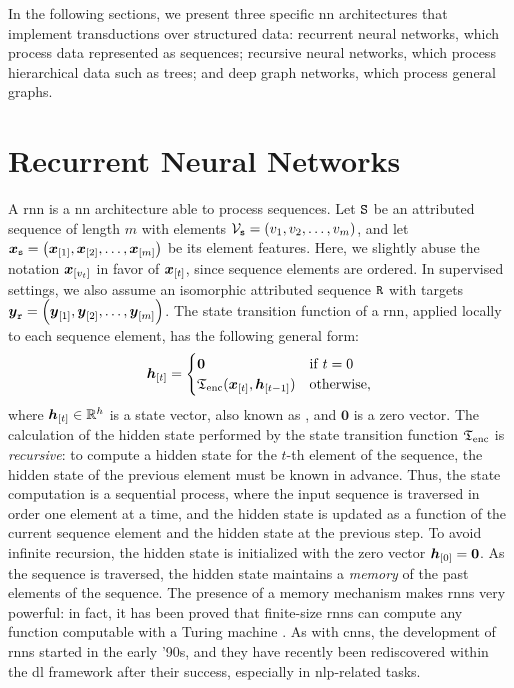 In the following sections, we present three specific \gls{nn} architectures that implement transductions over structured data: recurrent neural networks, which process data represented as sequences; recursive neural networks, which process hierarchical data such as trees; and deep graph networks, which process general graphs.

\section{Recurrent Neural Networks}\label{sec:rnns}
A \gls{rnn} is a \gls{nn} architecture able to process sequences. Let $\mathtt{S}$ be an attributed sequence of length $m$ with elements $\Nodes{s} = (v_1, v_2, \ldots, v_m)$, and let $\GraphFeatures{x}{s} = \Par{\Elem{x}{1}, \Elem{x}{2}, \ldots, \Elem{x}{m}}$ be its element features. Here, we slightly abuse the notation $\Elem{x}{v_t}$ in favor of $\Elem{x}{t}$, since sequence elements are ordered. In supervised settings, we also assume an isomorphic attributed sequence $\mathtt{R}$ with targets $\GraphFeatures{y}{r} = \Par{\Elem{y}{1}, \Elem{y}{2}, \ldots, \Elem{y}{m}}$. The state transition function of a \gls{rnn}, applied locally to each sequence element, has the following general form:
\begin{align*}
    \Elem{h}{t} =
    \begin{cases}
        \boldsymbol{0} & \mathrm{if}\; t = 0\\
        \EncTrans(\Elem{x}{t}, \Elem{h}{t-1}) & \mathrm{otherwise},
    \end{cases}
\end{align*}
where $\Elem{h}{t} \in \Real^h$ is a state vector, also known as , and $\boldsymbol{0}$ is a zero vector. The calculation of the hidden state performed by the state transition function $\mathfrak{T}_{\mathrm{enc}}$ is \emph{recursive}: to compute a hidden state for the $t$-th element of the sequence, the hidden state of the previous element must be known in advance. Thus, the state computation is a sequential process, where the input sequence is traversed in order one element at a time, and the hidden state is updated as a function of the current sequence element and the hidden state at the previous step. To avoid infinite recursion, the hidden state is initialized with the zero vector $\Elem{h}{0} = \boldsymbol{0}$. As the sequence is traversed, the hidden state maintains a \emph{memory} of the past elements of the sequence. The presence of a memory mechanism makes \glspl{rnn} very powerful: in fact, it has been proved that finite-size \glspl{rnn} can compute any function computable with a Turing machine \citep{siegelmann1995rnnturing}. As with \glspl{cnn}, the development of \glspl{rnn} started in the early '90s, and they have recently been rediscovered within the \gls{dl} framework after their success, especially in \gls{nlp}-related tasks.

